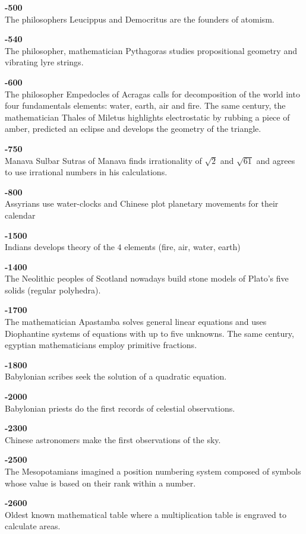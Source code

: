 \textbf{-500}\\
The philosophers Leucippus and Democritus are the founders of atomism.

\textbf{-540}\\
The philosopher, mathematician Pythagoras studies propositional geometry and vibrating lyre strings. 

\textbf{-600}\\
The philosopher Empedocles of Acragas calls for decomposition of the world into four fundamentals elements: water, earth, air and fire. The same century, the mathematician Thales of Miletus highlights electrostatic by rubbing a piece of amber, predicted an eclipse and develops the geometry of the triangle.

\textbf{-750}\\
Manava Sulbar Sutras of Manava finds irrationality of $\sqrt{2}$ and $\sqrt{61}$ and agrees to use irrational numbers in his calculations.

\textbf{-800}\\
Assyrians use water-clocks and Chinese plot planetary movements for their calendar

\textbf{-1500}\\
Indians develops theory of the $4$ elements (fire, air, water, earth)

\textbf{-1400}\\
The Neolithic peoples of Scotland nowadays build stone models of Plato's five solids (regular polyhedra).

\textbf{-1700}\\
The mathematician Apastamba solves general linear equations and uses Diophantine systems of equations with up to five unknowns. The same century, egyptian mathematicians employ primitive fractions.

\textbf{-1800}\\
Babylonian scribes seek the solution of a quadratic equation.

\textbf{-2000}\\
Babylonian priests do the first records of celestial observations.

\textbf{-2300}\\
Chinese astronomers make the first observations of the sky.

\textbf{-2500}\\
The Mesopotamians imagined a position numbering system composed of symbols whose value is based on their rank within a number.

\textbf{-2600}\\
Oldest known mathematical table where a multiplication table is engraved to calculate areas.

